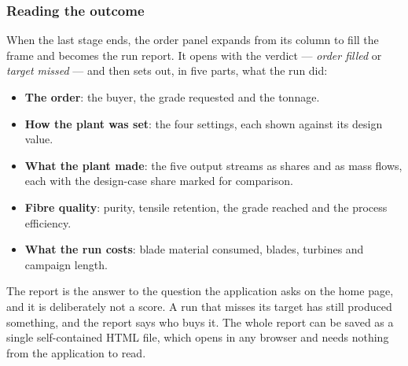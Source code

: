 \subsubsection{Reading the outcome}

When the last stage ends, the order panel expands from its column to fill the frame and becomes the run report. It opens with the verdict --- \emph{order filled} or \emph{target missed} --- and then sets out, in five parts, what the run did:

\begin{itemize}
  \item \textbf{The order}: the buyer, the grade requested and the tonnage.
  \item \textbf{How the plant was set}: the four settings, each shown against
        its design value.
  \item \textbf{What the plant made}: the five output streams as shares and as
        mass flows, each with the design-case share marked for comparison.
  \item \textbf{Fibre quality}: purity, tensile retention, the grade reached and
        the process efficiency.
  \item \textbf{What the run costs}: blade material consumed, blades, turbines
        and campaign length.
\end{itemize}

The report is the answer to the question the application asks on the home page, and it is deliberately not a score. A run that misses its target has still produced something, and the report says who buys it. The whole report can be saved as a single self-contained HTML file, which opens in any browser and needs nothing from the application to read.
